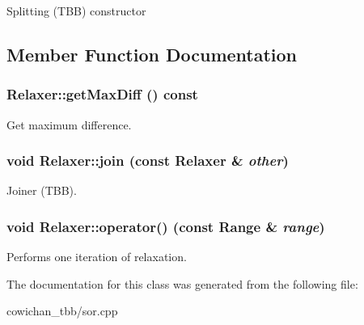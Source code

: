 Splitting (TBB) constructor 

\subsection{Member Function Documentation}
\hypertarget{class_relaxer_6b4b0383b11cfdc6fc48ec7e137e688d}{
\subsubsection[{getMaxDiff}]{ Relaxer::getMaxDiff () const}}
\label{class_relaxer_6b4b0383b11cfdc6fc48ec7e137e688d}


Get maximum difference. \hypertarget{class_relaxer_521cb3709f2af24b307114d016b2cd44}{
\subsubsection[{join}]{\setlength{\rightskip}{0pt plus 5cm}void Relaxer::join (const {\bf Relaxer} \& {\em other})}}
\label{class_relaxer_521cb3709f2af24b307114d016b2cd44}


Joiner (TBB). \hypertarget{class_relaxer_bbcc97706ee506fb14f822fe8ae57ee9}{
\subsubsection[{operator()}]{\setlength{\rightskip}{0pt plus 5cm}void Relaxer::operator() (const {\bf Range} \& {\em range})}}
\label{class_relaxer_bbcc97706ee506fb14f822fe8ae57ee9}


Performs one iteration of relaxation. 

The documentation for this class was generated from the following file:\begin{CompactItemize}
\item 
cowichan\_\-tbb/sor.cpp\end{CompactItemize}
